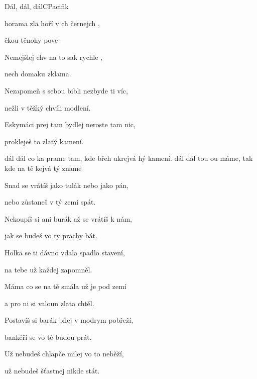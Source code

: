 \begin{song}{Dál, dál, dál}{C}{Pacifik}
  \begin{SBVerse}
 horama zla hoří v ch černejch ,

čkou těnohy pove--

Nemejšlej chv na to sak rychle ,

nech domaku zklama.
\end{SBVerse}
\begin{SBVerse}
Nezapomeň s sebou bibli nezbyde ti víc,

nežli v těžký chvíli modlení.

Eskymáci prej tam bydlej neroste tam nic,

prokleješ to zlatý kamení.

  \end{SBVerse}

\begin{SBChorus}
 dál dál co ka prame
tam, kde břeh ukrejvá hý kamení.
 dál dál tou ou máme,
tak kde na tě kejvá tý zname
\end{SBChorus}

\begin{SBVerse}
Snad se vrátíš jako tulák nebo jako pán,

nebo zůstaneš v tý zemi spát.

Nekoupíš si ani burák až se vrátíš k nám,

jak se budeš vo ty prachy bát.
\end{SBVerse}
\begin{SBVerse}
Holka se ti dávno vdala spadlo stavení,

na tebe už každej zapomněl.

Máma co se na tě smála už je pod zemí 

a pro ni si valoun zlata chtěl.
\end{SBVerse}

\begin{SBChorus}
\end{SBChorus}

\begin{SBVerse}
Postavíš si barák bílej v modrym pobřeží,

bankéři se vo tě budou prát.

Už nebudeš chlapče milej vo to neběží,

už nebudeš šťastnej nikde stát.
\end{SBVerse}

\begin{SBChorus}
\end{SBChorus}
\end{song}
\pagebreak
